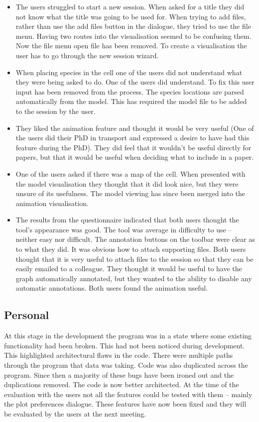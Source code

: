 \begin{itemize}
\item The users struggled to start a new session.  When asked for a title they did not know what the title was going to be used for.  When trying to add files, rather than use the add files button in the dialogue, they tried to use the file menu.  Having two routes into the visualisation seemed to be confusing them.  Now the file menu open file has been removed.  To create a visualisation the user has to go through the new session wizard.
\item When placing species in the cell one of the users did not understand what they were being asked to do.  One of the users did understand.  To fix this user input has been removed from the process.  The species locations are parsed automatically from the model.  This has required the model file to be added to the session by the user.
\item They liked the animation feature and thought it would be very useful (One of the users did their PhD in transport and expressed a desire to have had this feature during the PhD).  They did feel that it wouldn't be useful directly for papers, but that it would be useful when deciding what to include in a paper.
\item One of the users asked if there was a map of the cell.  When presented with the model visualisation they thought that it did look nice, but they were unsure of its usefulness.  The model viewing has since been merged into the animation visualisation.
\item The results from the questionnaire indicated that both users thought the tool's appearance was good.  The tool was average in difficulty to use -- neither easy nor difficult. The annotation buttons on the toolbar were clear as to what they did. It was obvious how to attach supporting files.  Both users thought that it is very useful to attach files to the session so that they can be easily emailed to a colleague.  They thought it would be useful to have the graph automatically annotated, but they wanted to the ability to disable any automatic annotations.  Both users found the animation useful.
\end{itemize}

\subsection{Personal}

At this stage in the development the program was in a state where some existing functionality had been broken.  This had not been noticed during development.  This highlighted architectural flaws in the code.  There were multiple paths through the program that data was taking.  Code was also duplicated across the program.  Since then a majority of these bugs have been ironed out and the duplications removed. The code is now better architected.  At the time of the evaluation with the users not all the features could be tested with them -- mainly the plot preferences dialogue.  These features have now been fixed and they will be evaluated by the users at the next meeting.


